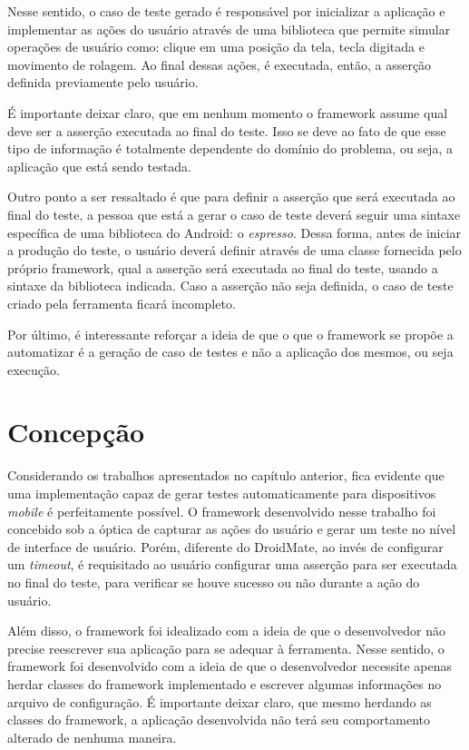 \documentclass[
    12pt,       %
    openright,      %
    twoside,      %
    a4paper,      %
    english,      %
    french,       %
    spanish,      %
    brazil,       %
    ]{abntex2}
\begin{document}
        Nesse sentido, o caso de teste gerado é responsável por inicializar a aplicação e implementar as
        ações do usuário através de uma biblioteca que permite simular operações de usuário como: clique
        em uma posição da tela, tecla digitada e movimento de rolagem. Ao final dessas ações, é executada,
        então, a asserção definida previamente pelo usuário.

        É importante deixar claro, que em nenhum momento o framework assume qual deve ser a asserção
        executada ao final do teste. Isso se deve ao fato de que esse tipo de informação é totalmente
        dependente do domínio do problema, ou seja, a aplicação que está sendo testada.

        Outro ponto a ser ressaltado é que para definir a asserção que será executada ao final do teste,
        a pessoa que está a gerar o caso de teste deverá seguir uma sintaxe específica de uma biblioteca
        do Android: o \textit{espresso}. Dessa forma, antes de iniciar a produção do teste, o usuário
        deverá definir através de uma classe fornecida pelo próprio framework, qual a asserção será
        executada ao final do teste, usando a sintaxe da biblioteca indicada. Caso a asserção não seja
        definida, o caso de teste criado pela ferramenta ficará incompleto.

        Por último, é interessante reforçar a ideia de que o que o framework se propõe a automatizar
        é a geração de caso de testes e não a aplicação dos mesmos, ou seja execução.

      \section{Concepção}
        Considerando os trabalhos apresentados no capítulo anterior, fica evidente que uma implementação
        capaz de gerar testes automaticamente para dispositivos \textit{mobile} é perfeitamente possível. O
        framework desenvolvido nesse trabalho foi concebido sob a óptica de capturar as ações do
        usuário e gerar um teste no nível de interface de usuário. Porém, diferente do DroidMate, ao invés
        de configurar um \textit{timeout}, é requisitado ao usuário configurar uma asserção
        para ser executada no final do teste, para verificar se houve sucesso ou não durante a ação
        do usuário.

        Além disso, o framework foi idealizado com a ideia de que o desenvolvedor não precise
        reescrever sua aplicação para se adequar à ferramenta. Nesse sentido, o framework
        foi desenvolvido com a ideia de que o desenvolvedor necessite apenas herdar classes
        do framework implementado e escrever algumas informações no arquivo de configuração.
        É importante deixar claro, que mesmo herdando as classes do framework, a aplicação
        desenvolvida não terá seu comportamento alterado de nenhuma maneira.
\end{document}
